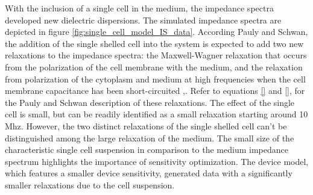 \par With the inclusion of a single cell in the medium, the impedance spectra developed new dielectric dispersions. The simulated impedance spectra are depicted in figure \ref{fig:single_cell_model_IS_data}. According Pauly and Schwan, the addition of the single shelled cell into the system is expected to add two new relaxations to the impedance spectra: the Maxwell-Wagner relaxation that occurs from the polarization of the cell membrane with the medium, and the relaxation from polarization of the cytoplasm and medium at high frequencies when the cell membrane capacitance has been short-circuited ,\cite{sun}. Refer to equations \ref{} and \ref{}, for the Pauly and Schwan description of these relaxations. The effect of the single cell is small, but can be readily identified as a small relaxation starting around 10 Mhz. However, the two distinct relaxations of the single shelled cell can't be distinguished among the large relaxation of the medium. The small size of the characteristic single cell suspension in comparison to the medium impedance spectrum highlights the importance of sensitivity optimization. The device model, which features a smaller device sensitivity, generated data with a significantly smaller relaxations due to the cell suspension. 

